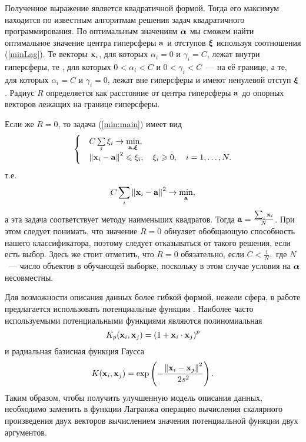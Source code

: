 Полученное выражение является квадратичной формой. 
Тогда его максимум находится по известным алгоритмам решения задач квадратичного программирования. 
По оптимальным значениям $\boldsymbol{\mathbf{\alpha}}$ мы сможем найти оптимальное значение центра гиперсферы $\boldsymbol{\mathbf{a}}$ и отступов $\boldsymbol{\mathbf{\xi}}$ используя соотношения (\ref{minLag}). 
Те векторы $\boldsymbol{\mathbf{x}}_i$, для которых $\alpha_i=0$ и $\gamma_i=C$, лежат внутри гиперсферы, те , для которых $0<\alpha_i<C$ и $0<\gamma_i<C$~--- на её границе, а те, для которых $\alpha_i=C$ и $\gamma_i=0$, лежат вне гиперсферы и имеют ненулевой отступ $\boldsymbol{\mathbf{\xi}}$. 
Радиус $R$ определяется как расстояние от центра гиперсферы $\boldsymbol{\mathbf{a}}$ до опорных векторов лежащих на границе гиперсферы.

Если же $R = 0$, то задача (\ref{min:main}) имеет вид 
\begin{equation}
			\begin{cases}
			&C\sum\limits_i\xi_i \to \min\limits_{\boldsymbol{\mathbf{a}}, \boldsymbol{\mathbf{\xi}}}, \\
			&\left\|{\boldsymbol{\mathbf{x}}_i-\boldsymbol{\mathbf{a}}}\right\|^2\leqslant \xi_i,\quad\xi_i\geqslant0,\quad i = 1,\ldots,N.
			\end{cases} 
\end{equation}
т.е.
\begin{equation}
			C\sum\limits_i\left\|{\boldsymbol{\mathbf{x}}_i-\boldsymbol{\mathbf{a}}}\right\|^2 \to \min\limits_{\boldsymbol{\mathbf{a}}},
\end{equation} 
а эта задача соответствует методу наименьших квадратов. Тогда $\boldsymbol{\mathbf{a}} = \frac{\sum_i \boldsymbol{\mathbf{x}}_i}N$. 
При этом следует понимать, что значение $R=0$ обнуляет обобщающую способность нашего классификатора, поэтому следует отказываться от такого решения, если есть выбор. 
Здесь же стоит отметить, что $R = 0$ обязательно, если $C < \frac1N,$ где $N$~--- число объектов в обучающей выборке, поскольку в этом случае условия на $\boldsymbol{\mathbf{\alpha}}$ несовместны.

Для возможности описания данных более гибкой формой, нежели сфера, в работе \cite{Tax2001} предлагается использовать потенциальные функции \cite{Izerman1979}. Наиболее часто используемыми потенциальными функциями являются полиномиальная
$$K_p(\boldsymbol{\mathbf{x}}_i, \boldsymbol{\mathbf{x}}_j) = \left(1 + \boldsymbol{\mathbf{x}}_i \cdot \boldsymbol{\mathbf{x}}_j\right)^p$$
и радиальная базисная функция Гаусса
$$K(\boldsymbol{\mathbf{x}}_i, \boldsymbol{\mathbf{x}}_j) = \exp\left(-\frac{\left\|{\boldsymbol{\mathbf{x}}_i - \boldsymbol{\mathbf{x}}_j}\right\|^2}{2s^2}\right).$$
Таким образом, чтобы получить улучшенную модель описания данных, необходимо заменить в функции Лагранжа операцию вычисления
скалярного произведения двух векторов вычислением значения потенциальной функции двух аргументов.
